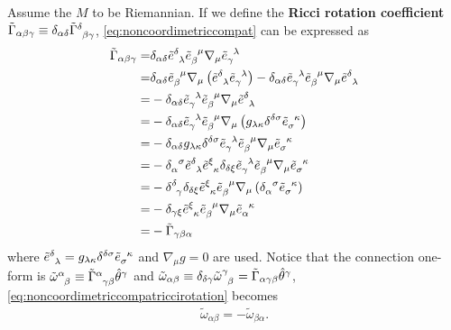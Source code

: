 \documentclass[10pt]{article}
\begin{document}
Assume the $M$ to be Riemannian.
If we define the \textbf{Ricci rotation coefficient} $\tilde{\Gamma}_{\alpha\beta\gamma}\equiv\delta_{\alpha\delta}\tensor{\tilde{\Gamma}}{^\delta_\beta_\gamma}$, \eqref{eq:noncoordimetriccompat} can be expressed as
\begin{align}
    \tilde{\Gamma}_{\alpha\beta\gamma}=&\delta_{\alpha\delta}\tensor{\tilde{e}}{^\delta_\lambda}\tensor{\tilde{e}}{_\beta^\mu}\nabla_\mu \tensor{\tilde{e}}{_\gamma^\lambda}\notag\\
    =&\delta_{\alpha\delta}\tensor{\tilde{e}}{_\beta^\mu}\nabla_\mu \left(\tensor{\tilde{e}}{^\delta_\lambda}\tensor{\tilde{e}}{_\gamma^\lambda}\right)-\delta_{\alpha\delta}\tensor{\tilde{e}}{_\gamma^\lambda}\tensor{\tilde{e}}{_\beta^\mu}\nabla_\mu \tensor{\tilde{e}}{^\delta_\lambda}\notag\\
    =&-\delta_{\alpha\delta}\tensor{\tilde{e}}{_\gamma^\lambda}\tensor{\tilde{e}}{_\beta^\mu}\nabla_\mu \tensor{\tilde{e}}{^\delta_\lambda}\notag\\
    =&-\delta_{\alpha\delta}\tensor{\tilde{e}}{_\gamma^\lambda}\tensor{\tilde{e}}{_\beta^\mu}\nabla_\mu\left(g_{\lambda\kappa}\delta^{\delta\sigma}\tensor{\tilde{e}}{_\sigma^\kappa}\right)\notag\\
    =&-\delta_{\alpha\delta}g_{\lambda\kappa}\delta^{\delta\sigma}\tensor{\tilde{e}}{_\gamma^\lambda}\tensor{\tilde{e}}{_\beta^\mu}\nabla_\mu \tensor{\tilde{e}}{_\sigma^\kappa}\notag\\
    =&-\tensor{\delta}{_\alpha^\sigma}\tensor{\tilde{e}}{^\delta_\lambda}\tensor{\tilde{e}}{^\xi_\kappa}\delta_{\delta\xi}\tensor{\tilde{e}}{_\gamma^\lambda}\tensor{\tilde{e}}{_\beta^\mu}\nabla_\mu \tensor{\tilde{e}}{_\sigma^\kappa}\notag\\
    =&-\tensor{\delta}{^\delta_\gamma}\delta_{\delta\xi}\tensor{\tilde{e}}{^\xi_\kappa}\tensor{\tilde{e}}{_\beta^\mu}\nabla_\mu\left(\tensor{\delta}{_\alpha^\sigma}\tensor{\tilde{e}}{_\sigma^\kappa}\right)\notag\\
    =&-\delta_{\gamma\xi}\tensor{\tilde{e}}{^\xi_\kappa}\tensor{\tilde{e}}{_\beta^\mu}\nabla_\mu\tensor{\tilde{e}}{_\alpha^\kappa}\notag\\
    =&-\tilde{\Gamma}_{\gamma\beta\alpha}\label{eq:noncoordimetriccompatriccirotation}
\end{align}
where $\tensor{\tilde{e}}{^\delta_\lambda}=g_{\lambda\kappa}\delta^{\delta\sigma}\tensor{\tilde{e}}{_\sigma^\kappa}$ and $\nabla_\mu g=0$ are used.
Notice that the connection one-form is $\tensor{\tilde{\omega}}{^\alpha_\beta}\equiv\tensor{\tilde{\Gamma}}{^\alpha_\gamma_\beta}\hat{\theta}^\gamma$ and $\tilde{\omega}_{\alpha\beta}\equiv\delta_{\delta\gamma}\tensor{\tilde{\omega}}{^\gamma_\beta}=\tilde{\Gamma}_{\alpha\gamma\beta}\hat{\theta}^{\gamma}$, \eqref{eq:noncoordimetriccompatriccirotation} becomes 
\begin{align}
    \tilde{\omega}_{\alpha\beta}=-\tilde{\omega}_{\beta\alpha}.
\end{align}
\end{document}
